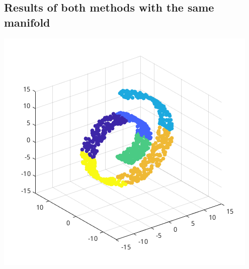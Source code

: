 \documentclass[a0,portrait]{a0poster}
\begin{document}
\begin{multicols}{3}
    \subsection*{Results of both methods with the same manifold}

    \begin{center}
        \includegraphics[width=0.5\linewidth]{figures/swiss_roll.png}
    \end{center}


\end{multicols}
\end{document}
